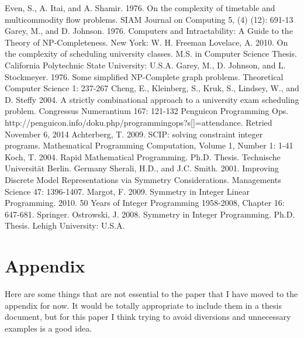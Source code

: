 \documentclass[]{article}
\theoremstyle{definition}
\theoremstyle{remark}
\numberwithin{equation}{section}
\begin{document}
\pagebreak

\begin{thebibliography}{9}
	Even, S., A. Itai, and A. Shamir. 1976. On the complexity of timetable and multicommodity flow problems. SIAM Journal on Computing 5, (4) (12): 691-13
	Garey, M., and D. Johnson. 1976. Computers and Intractability: A Guide to the Theory of NP-Completeness. New York: W. H. Freeman
	Lovelace, A. 2010. On the complexity of scheduling university classes. M.S. in Computer Science Thesis. California Polytechnic State University: U.S.A.	
	Garey, M., D. Johnson, and L. Stockmeyer. 1976. Some simplified NP-Complete graph problems. Theoretical Computer Science 1: 237-267
	Cheng, E., Kleinberg, S., Kruk, S., Lindsey, W., and D. Steffy 2004. A strictly combinational approach to a university exam scheduling problem. Congressus Numerantium 167: 121-132
	Penguicon Programming Ops. http://penguicon.info/doku.php/programmingops?s[]=attendance. Retried November 6, 2014
	Achterberg, T. 2009. SCIP: solving constraint integer programs. Mathematical Programming Computation, Volume 1, Number 1: 1-41
	Koch, T. 2004. Rapid Mathematical Programming. Ph.D. Thesis. Technische Universit{\"a}t Berlin. Germany
	Sherali, H.D., and J.C. Smith. 2001. Improving Discrete Model Representations via Symmetry Considerations. Managements Science 47: 1396-1407.
	Margot, F. 2009. Symmetry in Integer Linear Programming. 2010. 50 Years of Integer Programming 1958-2008, Chapter 16: 647-681. Springer.
	Ostrowski, J. 2008. Symmetry in Integer Programming. Ph.D. Thesis. Lehigh University: U.S.A. 
\end{thebibliography}

\section{Appendix}

Here are some things that are not essential to the paper that I have moved to the appendix for now.
It would be totally appropriate to include them in a thesis document, but for this paper I think trying to avoid diversions and unnecessary examples is a good idea.
\end{document}
